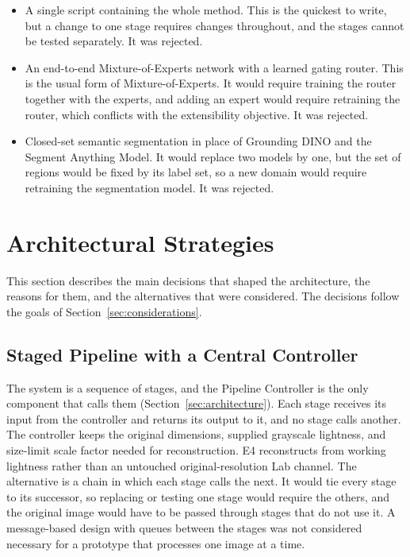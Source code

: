 \documentclass{FastFyp}
\begin{document}
\begin{itemize}
    \item A single script containing the whole method. This is the quickest to write, but a change to one stage requires changes throughout, and the stages cannot be tested separately. It was rejected.
    \item An end-to-end Mixture-of-Experts network with a learned gating router. This is the usual form of Mixture-of-Experts. It would require training the router together with the experts, and adding an expert would require retraining the router, which conflicts with the extensibility objective. It was rejected.
    \item Closed-set semantic segmentation in place of Grounding DINO and the Segment Anything Model. It would replace two models by one, but the set of regions would be fixed by its label set, so a new domain would require retraining the segmentation model. It was rejected.
\end{itemize}

\section{Architectural Strategies}
\label{sec:strategies}

This section describes the main decisions that shaped the architecture, the reasons for them, and the alternatives that were considered. The decisions follow the goals of Section~\ref{sec:considerations}.

\subsection{Staged Pipeline with a Central Controller}

The system is a sequence of stages, and the Pipeline Controller is the only component that calls them (Section~\ref{sec:architecture}). Each stage receives its input from the controller and returns its output to it, and no stage calls another. The controller keeps the original dimensions, supplied grayscale lightness, and size-limit scale factor needed for reconstruction. E4 reconstructs from working lightness rather than an untouched original-resolution Lab channel. The alternative is a chain in which each stage calls the next. It would tie every stage to its successor, so replacing or testing one stage would require the others, and the original image would have to be passed through stages that do not use it. A message-based design with queues between the stages was not considered necessary for a prototype that processes one image at a time.
\end{document}
